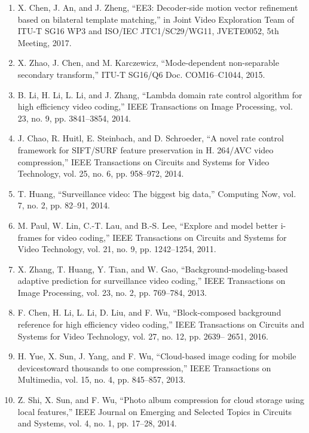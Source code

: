 \documentclass{article}
\begin{document}
\begin{enumerate}
	\item X. Chen, J. An, and J. Zheng, “EE3: Decoder-side motion vector refinement based on bilateral template matching,” in Joint Video Exploration
	Team of ITU-T SG16 WP3 and ISO/IEC JTC1/SC29/WG11, JVETE0052, 5th Meeting, 2017.

	\item X. Zhao, J. Chen, and M. Karczewicz, “Mode-dependent non-separable
	secondary transform,” ITU-T SG16/Q6 Doc. COM16–C1044, 2015.

	\item B. Li, H. Li, L. Li, and J. Zhang, “Lambda domain rate control algorithm for
	high efficiency video coding,” IEEE Transactions on Image Processing,
	vol. 23, no. 9, pp. 3841–3854, 2014.

	\item J. Chao, R. Huitl, E. Steinbach, and D. Schroeder, “A novel rate control
	framework for SIFT/SURF feature preservation in H. 264/AVC video
	compression,” IEEE Transactions on Circuits and Systems for Video
	Technology, vol. 25, no. 6, pp. 958–972, 2014.

	\item T. Huang, “Surveillance video: The biggest big data,” Computing Now,
	vol. 7, no. 2, pp. 82–91, 2014.

	\item M. Paul, W. Lin, C.-T. Lau, and B.-S. Lee, “Explore and model better
	i-frames for video coding,” IEEE Transactions on Circuits and Systems
	for Video Technology, vol. 21, no. 9, pp. 1242–1254, 2011.

	\item X. Zhang, T. Huang, Y. Tian, and W. Gao, “Background-modeling-based
	adaptive prediction for surveillance video coding,” IEEE Transactions
	on Image Processing, vol. 23, no. 2, pp. 769–784, 2013.

	\item F. Chen, H. Li, L. Li, D. Liu, and F. Wu, “Block-composed background
	reference for high efficiency video coding,” IEEE Transactions on
	Circuits and Systems for Video Technology, vol. 27, no. 12, pp. 2639–
	2651, 2016.

	\item H. Yue, X. Sun, J. Yang, and F. Wu, “Cloud-based image coding for mobile devicestoward thousands to one compression,” IEEE Transactions
	on Multimedia, vol. 15, no. 4, pp. 845–857, 2013.

	\item Z. Shi, X. Sun, and F. Wu, “Photo album compression for cloud storage
	using local features,” IEEE Journal on Emerging and Selected Topics
	in Circuits and Systems, vol. 4, no. 1, pp. 17–28, 2014.
	

\end{enumerate}
\end{document}

